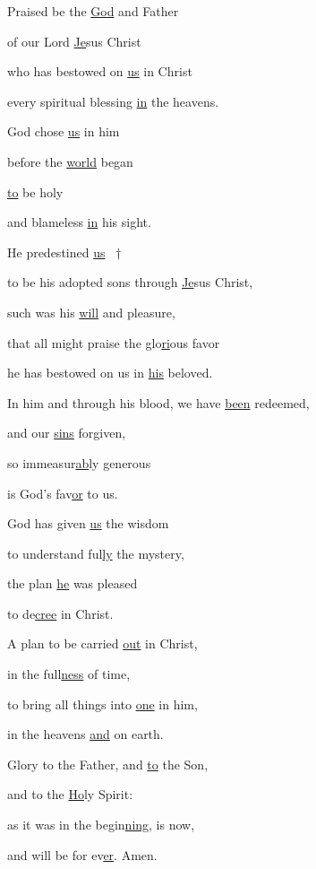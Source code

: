 \noindent Praised be the \uline{God} and Father ~\GreStar{}~\nopagebreak

of our Lord \uline{Je}sus Christ

\noindent who has bestowed on \uline{us} in Christ ~\GreStar{}~\nopagebreak

every spiritual blessing \uline{in} the heavens.

\noindent God chose \uline{us} in him ~\GreStar{}~\nopagebreak

before the \uline{world} began

\noindent \uline{to} be holy ~\GreStar{}~\nopagebreak

and blameless \uline{in} his sight.

\noindent He predestined \uline{us} ~†~\nopagebreak

to be his adopted sons through \uline{Je}sus Christ, ~\GreStar{}~\nopagebreak

such was his \uline{will} and pleasure,

\noindent that all might praise the glo\uline{ri}ous favor ~\GreStar{}~\nopagebreak

he has bestowed on us in \uline{his} beloved.

\noindent In him and through his blood, we have \uline{been} redeemed, ~\GreStar{}~\nopagebreak

and our \uline{sins} forgiven,

\noindent so immeasur\uline{ab}ly generous ~\GreStar{}~\nopagebreak

is God’s fav\uline{or} to us.

\noindent God has given \uline{us} the wisdom ~\GreStar{}~\nopagebreak

to understand ful\uline{ly} the mystery,

\noindent the plan \uline{he} was pleased ~\GreStar{}~\nopagebreak

to de\uline{cree} in Christ.

\noindent A plan to be carried \uline{out} in Christ, ~\GreStar{}~\nopagebreak

in the full\uline{ness} of time,

\noindent to bring all things into \uline{one} in him, ~\GreStar{}~\nopagebreak

in the heavens \uline{and} on earth.

\noindent Glory to the Father, and \uline{to} the Son,~\GreStar{}~\nopagebreak

and to the \uline{Ho}ly Spirit:

\noindent as it was in the begin\uline{ning}, is now,~\GreStar{}~\nopagebreak

and will be for ev\uline{er}. Amen.
